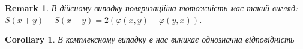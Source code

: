 \documentclass[a4paper, 10pt]{article}
\theoremstyle{theoremdd}
\theoremstyle{theoremdd}
\theoremstyle{theoremdd}
\theoremstyle{theoremdd}
\theoremstyle{theoremdd}
\theoremstyle{theoremdd}
\newtheorem{remark}[theorem]{Remark}
\theoremstyle{theoremdd}
\theoremstyle{theoremdd}
\newtheorem{corollary}[theorem]{Corollary}
\begin{document}
\begin{remark}
В дійсному випадку поляризаційна тотожність має такий вигляд:\\
$S(x+y) - S(x-y) = 2 (\varphi(x,y) + \varphi(y,x))$.
\end{remark}

\begin{corollary}
В комплексному випадку в нас виникає однозначна відповідність\\
\end{corollary}
\end{document}
